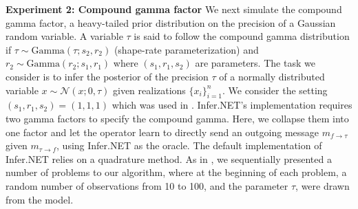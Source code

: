 \documentclass[english]{article}
\theoremstyle{plain}
\theoremstyle{plain}
\newcommand{\factor}{f}				%
\newcommand{\msg}[2]{m_{#1 \rightarrow #2}}			%
\begin{document}
\textbf{Experiment 2: Compound gamma factor} We next simulate the compound gamma factor, 
 a heavy-tailed prior distribution on the precision of a Gaussian random variable.
A variable $\tau$ is said to follow the compound gamma distribution 
if $\tau \sim \text{Gamma}(\tau; s_2, r_2)$ (shape-rate parameterization) and 
$r_2 \sim \text{Gamma}(r_2; s_1, r_1)$ where $(s_1, r_1, s_2)$ are parameters. 
The task we consider is to infer the posterior of the precision $\tau$ of a normally 
distributed variable $x \sim \mathcal{N}(x; 0, \tau)$ given realizations 
$\{x_i\}_{i=1}^n$. We consider the setting $(s_1, r_1, s_2) = (1, 1, 1)$ which was 
used in \cite{Heess2013}. Infer.NET's implementation requires two gamma factors
to specify the compound gamma. Here, we collapse them into one factor 
and let the operator learn to directly send an outgoing message $\msg{\factor}{\tau}$ 
given $\msg{\tau}{\factor}$, using Infer.NET as the oracle. 
The  default implementation of Infer.NET relies on a quadrature method.
As in \cite{Eslami2014}, we sequentially presented a number of 
problems to our algorithm, where at the beginning of each problem, a random number of observations 
from 10 to 100, and the parameter $\tau$, were drawn from the model.
\end{document}
